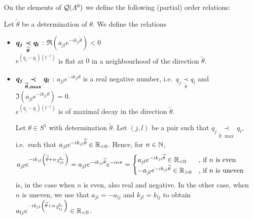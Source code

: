 On the elements of $\cQ(A^0)$ we define the following (partial) order
relations:
\begin{defn}
  Let $\tilde\theta$ be a determination of $\theta$.
  We define the relations
  \begin{itemize}
    \item $\boldmath q_j \underset{\tilde\theta}{\prec} q_l$
      :\Leftrightarrow{} $\Re(a_{jl}e^{-ik_{jl}\tilde\theta})<0$
    \\\Leftrightarrow{} $e^{(q_j-g_l)(t^{-1})}$ is
      flat at $0$ in a neighbourhood of the direction $\tilde\theta$.
    \item $\boldmath q_j \underset{\tilde\theta,\max}{\prec} q_l$
      :\Leftrightarrow{} $a_{jl}e^{-ik_{jl}\tilde\theta}$ is a real negative
      number, i.e.\ $q_j \underset{\tilde\theta}{\prec} q_l$ and
      $\Im(a_{jl}e^{-ik_{jl}\theta})=0$.
      \\\Leftrightarrow{} $e^{(q_j-g_l)(t^{-1})}$ is of maximal
      decay in the direction $\tilde\theta$.
      \begin{comment}
        \Leftrightarrow{} $q_{jl}(t^{-1})\in\R_{<0}$ along $\tilde\theta$.
      \end{comment}
      \begin{s-rem} \label{rem:rotationalSym}
        Let $\theta\in S^1$ with determination $\tilde\theta$.
        Let $(j,l)$ be a pair such that
        $q_j \underset{\tilde\theta,\max}{\prec} q_l$, i.e.\ such that
        $a_{jl}e^{-ik_{jl}\tilde\theta}\in\R_{<0}$.
        Hence, for $n\in\N$,
        \begin{align*}
          a_{jl}e^{-ik_{jl}\left(\tilde\theta+n\frac{\pi}{k_{jl}}\right)}
          &=a_{jl}e^{-ik_{jl}\tilde\theta}e^{-in\pi}
          = \begin{cases}
            a_{jl}e^{-ik_{jl}\tilde\theta}\in\R_{<0} 
              & \text{, if $n$ is even}
          \\-a_{jl}e^{-ik_{jl}\tilde\theta}\in\R_{>0} 
              & \text{, if $n$ is uneven}
          \end{cases}
        \end{align*}
        is, in the case when $n$ is even, also real and negative. In the other
        case, when $n$ is uneven, we use that $a_{jl}=-a_{lj}$ and
        $k_{jl}=k_{lj}$ to obtain
        $a_{lj}e^{-ik_{jl}\left(\tilde\theta+n\frac{\pi}{k_{lj}}\right)}
        \in\R_{<0}$.


\end{s-rem}
\end{itemize}
\end{defn}
